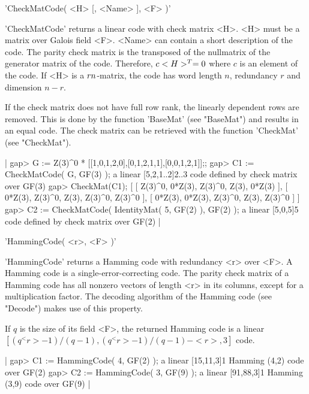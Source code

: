 
'CheckMatCode( <H> [, <Name> ], <F> )'

'CheckMatCode' returns a linear code with check matrix <H>. <H> must be a
matrix over  Galois field <F>. <Name> can  contain a short description of
the code. The parity check matrix is  the transposed of the nullmatrix of
the generator matrix of the code. Therefore, $c\*<H>^T =  0$ where $c$ is
an  element of the code.  If <H>  is a $r\*n$-matrix,   the code has word
length $n$, redundancy $r$ and dimension $n-r$.

If the  check matrix does not have  full row rank, the linearly dependent
rows are removed. This is done  by the function 'BaseMat' (see "BaseMat")
and results in an equal code. The check matrix  can be retrieved with the
function 'CheckMat' (see "CheckMat").

|    gap> G := Z(3)^0 * [[1,0,1,2,0],[0,1,2,1,1],[0,0,1,2,1]];;
    gap> C1 := CheckMatCode( G, GF(3) );
    a linear [5,2,1..2]2..3 code defined by check matrix over GF(3)
    gap> CheckMat(C1);
    [ [ Z(3)^0, 0*Z(3), Z(3)^0, Z(3), 0*Z(3) ],
      [ 0*Z(3), Z(3)^0, Z(3), Z(3)^0, Z(3)^0 ],
      [ 0*Z(3), 0*Z(3), Z(3)^0, Z(3), Z(3)^0 ] ]
    gap> C2 := CheckMatCode( IdentityMat( 5, GF(2) ), GF(2) );
    a linear [5,0,5]5 code defined by check matrix over GF(2) |


'HammingCode( <r>, <F> )'

'HammingCode'  returns a Hamming  code with  redundancy <r>  over <F>.  A
Hamming code is a single-error-correcting  code. The parity check  matrix
of a Hamming code  has all nonzero vectors  of length <r> in its columns,
except for a multiplication factor. The decoding algorithm of the Hamming
code (see "Decode") makes use of this property.

If  $q$ is the  size  of its field  <F>,  the returned  Hamming code is a
linear\\ $[(q^<r>-1)/(q-1), (q^<r>-1)/(q-1) - <r>, 3]$ code.

|    gap> C1 := HammingCode( 4, GF(2) );
    a linear [15,11,3]1 Hamming (4,2) code over GF(2)
    gap> C2 := HammingCode( 3, GF(9) );
    a linear [91,88,3]1 Hamming (3,9) code over GF(9) |


